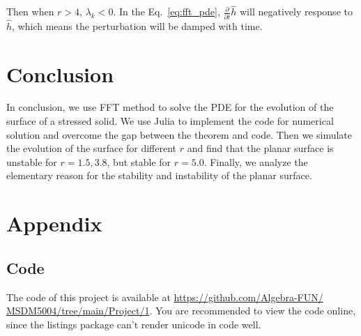 \documentclass[runningheads]{llncs}
\begin{document}
Then when $r > 4$, $\lambda_k < 0$. 
In the Eq.~\eqref{eq:fft_pde}, $\frac{\partial}{\partial t}\hat{h}$ will negatively response to $\hat{h}$, which means the perturbation will be damped with time.

\section{Conclusion}

In conclusion, we use FFT method to solve the PDE for the evolution of the surface of a stressed solid. 
We use Julia to implement the code for numerical solution and overcome the gap between the theorem and code.
Then we simulate the evolution of the surface for different $r$ and find that the planar surface is unstable for $r=1.5,3.8$, but stable for $r=5.0$.
Finally, we analyze the elementary reason for the stability and instability of the planar surface.






\newpage
\section*{Appendix}
\subsection*{Code}

The code of this project is available at \url{https://github.com/Algebra-FUN/
MSDM5004/tree/main/Project/1}. You are recommended to view the code online, since the listings package can't render unicode in code well.




\end{document}
